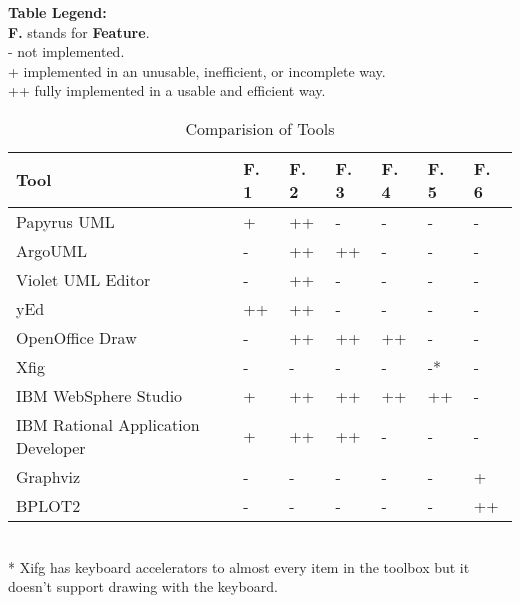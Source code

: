 \begin{center}
	\begin{table}[h]
	\footnotesize
	{\bf Table Legend:}\\
	{\bf F.} stands for {\bf Feature}.\\
	- not implemented.\\
	+ implemented in an unusable, inefficient, or incomplete way.\\
	++ fully implemented in a usable and efficient way.\\
	\begin{tabular}{ | l | l | l | l | l | l | l |}
	\hline
	{\bf Tool} & {\bf F. 1} & {\bf F. 2} & {\bf F. 3} & {\bf F. 4} & {\bf F. 5} & {\bf F. 6}\\ \hline \hline 
	Papyrus UML\cite{papyrus} & + & ++ & - & - & - & -\\ \hline
	ArgoUML\cite{argouml} & - & ++ & ++ & - & - & -\\ \hline
	Violet UML Editor\cite{violet} & - & ++ & - & - & - & -\\ \hline
	yEd\cite{yed} & ++ & ++ & - & - & - & -\\ \hline
	OpenOffice Draw\cite{oo_draw} & - & ++ & ++ & ++ & - & -\\ \hline
	Xfig\cite{xfig} & - & - & - & - & -* & -\\ \hline
	IBM WebSphere Studio\cite{ibm_websphere_studio} & + & ++ & ++ & ++ & ++ & -\\ \hline
	IBM Rational Application Developer\cite{ibm_rational_application_developper} & + & ++ & ++ & - & - & -\\ \hline
	Graphviz\cite{graphviz} & - & - & - & - & - & +\\ \hline
	BPLOT2\cite{bplot2} & - & - & - & - & - & ++\\ \hline
	\end{tabular}\\
	\footnotesize
	{* Xifg has keyboard accelerators to almost every item in the toolbox but it doesn't support drawing with the keyboard.}
	\caption{Comparision of Tools}
	\end{table}
\end{center}

